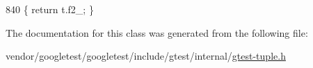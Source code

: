 \begin{DoxyCode}
840                              \{ \textcolor{keywordflow}{return} t.f2\_; \}
\end{DoxyCode}


The documentation for this class was generated from the following file\+:\begin{DoxyCompactItemize}
\item 
vendor/googletest/googletest/include/gtest/internal/\hyperlink{gtest-tuple_8h}{gtest-\/tuple.\+h}\end{DoxyCompactItemize}
